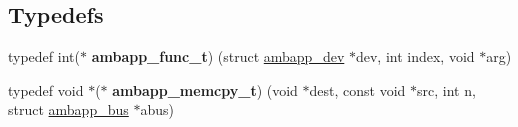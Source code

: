 \subsection*{Typedefs}
\begin{DoxyCompactItemize}
\item 
\mbox{\label{group__amba_gaec2335f8be2a776d9cf3111f07217c87}} 
typedef int($\ast$ {\bfseries ambapp\+\_\+func\+\_\+t}) (struct \mbox{\hyperlink{structambapp__dev}{ambapp\+\_\+dev}} $\ast$dev, int index, void $\ast$arg)
\item 
\mbox{\label{group__amba_ga9df8a55ca7eadee70cbd820a27082838}} 
typedef void $\ast$($\ast$ {\bfseries ambapp\+\_\+memcpy\+\_\+t}) (void $\ast$dest, const void $\ast$src, int n, struct \mbox{\hyperlink{structambapp__bus}{ambapp\+\_\+bus}} $\ast$abus)
\end{DoxyCompactItemize}
